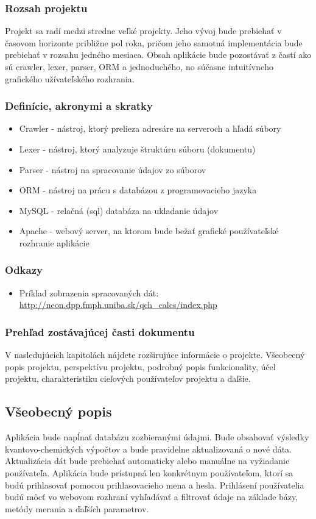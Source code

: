 \documentclass[12pt,a4paper]{article}
\begin{document}
\subsubsection{Rozsah projektu}
Projekt sa radí medzi stredne veľké projekty. Jeho vývoj bude prebiehať v časovom horizonte približne pol roka, pričom jeho samotná implementácia bude prebiehať v rozsahu jedného mesiaca. Obsah aplikácie bude pozostávať z častí ako sú crawler, lexer, parser, ORM a jednoduchého, no súčasne intuitívneho grafického užívateľského rozhrania.

\subsubsection{Definície, akronymi a skratky}
\begin{itemize}
	\item Crawler - nástroj, ktorý prelieza adresáre na serveroch a hľadá súbory
	\item Lexer - nástroj, ktorý analyzuje štruktúru súboru (dokumentu)
	\item Parser - nástroj na spracovanie údajov zo súborov
	\item ORM - nástroj na prácu s databázou z programovacieho jazyka
	\item MySQL - relačná (sql) databáza na ukladanie údajov
	\item Apache - webový server, na ktorom bude bežať grafické používateľské rozhranie aplikácie
\end{itemize}

\subsubsection{Odkazy}
\begin{itemize}
	\item Príklad zobrazenia spracovaných dát: \url{http://neon.dpp.fmph.uniba.sk/qch_calcs/index.php}
\end{itemize}

\subsubsection{Prehľad zostávajúcej časti dokumentu}
V nasledujúcich kapitolách nájdete rozširujúce informácie o projekte. Všeobecný popis projektu, perspektívu projektu, podrobný popis funkcionality, účel projektu, charakteristiku cieľových používateľov projektu a ďaľšie.

\subsection{Všeobecný popis}
Aplikácia bude napĺnať databázu zozbieranými údajmi. Bude obsahovať výsledky kvantovo-chemických výpočtov a bude pravidelne aktualizovaná o nové dáta. Aktualizácia dát bude prebiehať automaticky alebo manuálne na vyžiadanie používateľa. Aplikácia bude prístupná len konkrétnym používateľom, ktorí sa budú prihlasovať pomocou prihlasovacieho mena a hesla. Prihlásení používatelia budú môcť vo webovom rozhraní vyhľadávať a filtrovať údaje na základe bázy, metódy merania a ďaľších parametrov. 
\end{document}
